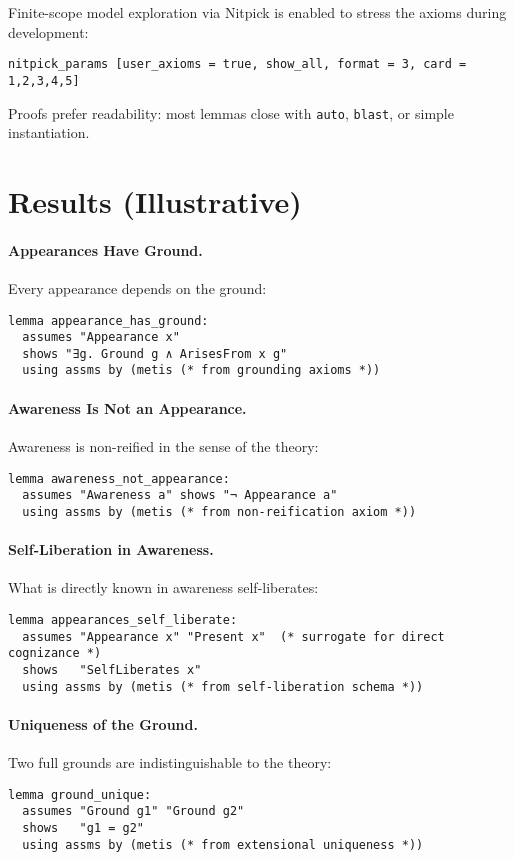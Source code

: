 \documentclass[11pt,a4paper]{article}
\begin{document}
Finite-scope model exploration via Nitpick is enabled to stress the axioms
during development:
\begin{lstlisting}
nitpick_params [user_axioms = true, show_all, format = 3, card = 1,2,3,4,5]
\end{lstlisting}
Proofs prefer readability: most lemmas close with \texttt{auto}, \texttt{blast},
or simple instantiation.

\section{Results (Illustrative)}

\paragraph{Appearances Have Ground.}
Every appearance depends on the ground:
\begin{lstlisting}
lemma appearance_has_ground:
  assumes "Appearance x"
  shows "∃g. Ground g ∧ ArisesFrom x g"
  using assms by (metis (* from grounding axioms *))
\end{lstlisting}

\paragraph{Awareness Is Not an Appearance.}
Awareness is non-reified in the sense of the theory:
\begin{lstlisting}
lemma awareness_not_appearance:
  assumes "Awareness a" shows "¬ Appearance a"
  using assms by (metis (* from non-reification axiom *))
\end{lstlisting}

\paragraph{Self-Liberation in Awareness.}
What is directly known in awareness self-liberates:
\begin{lstlisting}
lemma appearances_self_liberate:
  assumes "Appearance x" "Present x"  (* surrogate for direct cognizance *)
  shows   "SelfLiberates x"
  using assms by (metis (* from self-liberation schema *))
\end{lstlisting}

\paragraph{Uniqueness of the Ground.}
Two full grounds are indistinguishable to the theory:
\begin{lstlisting}
lemma ground_unique:
  assumes "Ground g1" "Ground g2"
  shows   "g1 = g2"
  using assms by (metis (* from extensional uniqueness *))
\end{lstlisting}
\end{document}
